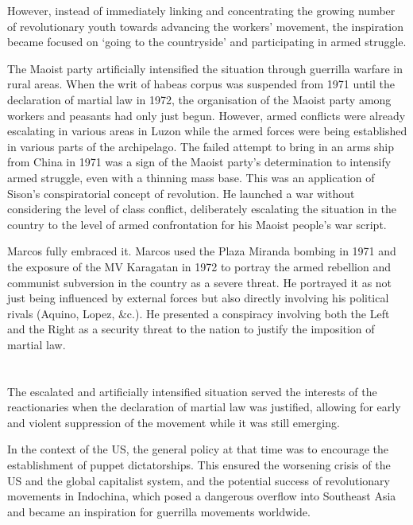 However, 
instead of immediately linking and concentrating 
the growing number of revolutionary youth 
towards advancing the workers' movement, 
the inspiration became focused on `going to the countryside' 
and participating in armed struggle.

The Maoist party artificially intensified the situation 
through guerrilla warfare in rural areas. 
When the writ of habeas corpus was suspended 
from 1971 until the declaration of martial law in 1972,
the organisation of the Maoist party among workers and peasants 
had only just begun. 
However, armed conflicts were already escalating 
in various areas in Luzon 
while the armed forces were being established 
in various parts of the archipelago. 
The failed attempt to bring in an arms ship from China in 1971 
was a sign of the Maoist party's determination 
to intensify armed struggle, 
even with a thinning mass base. 
This was an application of Sison's conspiratorial concept of revolution. 
He launched a war without considering 
the level of class conflict, 
deliberately escalating the situation in the country 
to the level of armed confrontation 
for his Maoist people's war script.

Marcos fully embraced it. 
Marcos used the Plaza Miranda bombing in 1971 
and the exposure of the MV Karagatan in 1972 
to portray the armed rebellion and communist subversion in the country 
as a severe threat. 
He portrayed it as not just being influenced by external forces 
but also directly involving his political rivals (Aquino, Lopez, \&c.). 
He presented a conspiracy involving both the Left and the Right 
as a security threat to the nation to justify the imposition of martial law.


\section{}
The escalated and artificially intensified situation 
served the interests of the reactionaries 
when the declaration of martial law was justified, 
allowing for early and violent suppression of the movement 
while it was still emerging.

In the context of the US, 
the general policy at that time 
was to encourage the establishment of puppet dictatorships. 
This ensured the worsening crisis of the US and the global capitalist system, 
and the potential success of revolutionary movements in Indochina, 
which posed a dangerous overflow into Southeast Asia 
and became an inspiration for guerrilla movements worldwide.

